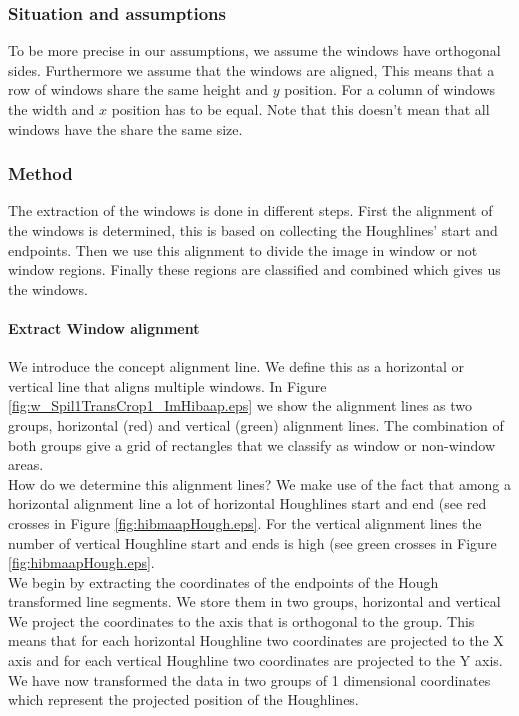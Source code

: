 \subsubsection{Situation and assumptions}
To be more precise in our assumptions, we assume the windows have orthogonal sides.  Furthermore we
assume that the windows are aligned, This means that a row of windows share the
same height and $y$ position. For a column of windows the width and $x$
position has to be equal.  Note that this doesn't mean that all windows have the
share the same size.

\subsubsection{Method}
The extraction of the windows is done in different steps. 
First the alignment of the windows is determined, this is based on collecting
the Houghlines' start and endpoints. Then we use this alignment to divide the
image in window or not window regions.  Finally these regions are classified
and combined which gives us the windows.


\paragraph{Extract Window alignment}
We introduce the concept alignment line. We define this as a horizontal or
vertical line that aligns multiple windows. In Figure
\ref{fig:w_Spil1TransCrop1_ImHibaap.eps}
we show the alignment lines as two groups, horizontal (red) and
vertical (green) alignment lines.  The combination of both groups give a grid of
rectangles that we classify as window or non-window areas.\\

How do we determine this alignment lines? We make use of the fact that among a
horizontal alignment line a lot of horizontal Houghlines start and end (see red
crosses in Figure \ref{fig:hibmaapHough.eps}. For the vertical alignment lines
the number of vertical Houghline start and ends is high (see green crosses in
Figure \ref{fig:hibmaapHough.eps}.\\

We begin by extracting the coordinates of the endpoints of the Hough transformed line
segments. We store them in two groups, horizontal and vertical%
We project the coordinates to the axis that is orthogonal to the group. This
means that for each horizontal Houghline two coordinates are projected to the X
axis and for each vertical Houghline two coordinates are projected to the Y
axis. We have now transformed the data in two groups of 1 dimensional
coordinates which represent the projected position of the Houghlines.\\

